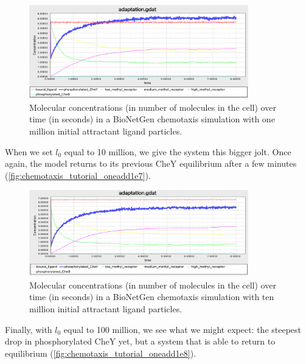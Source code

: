 \begin{figure}[h]
\centering
\mySfFamily
\includegraphics[width = 0.85\textwidth]{../images/chemotaxis_tutorial_oneadd1e6.png}
\caption{Molecular concentrations (in number of molecules in the cell) over time (in seconds) in a BioNetGen chemotaxis simulation with one million initial attractant ligand particles.}
\label{fig:chemotaxis_tutorial_oneadd16}
\end{figure}

When we set $l_0$ equal to 10 million, we give the system this bigger jolt. Once again, the model returns to its previous CheY equilibrium after a few minutes (\autoref{fig:chemotaxis_tutorial_oneadd1e7}).

\begin{figure}[h]
\centering
\mySfFamily
\includegraphics[width = 0.85\textwidth]{../images/chemotaxis_tutorial_oneadd1e7.png}
\caption{Molecular concentrations (in number of molecules in the cell) over time (in seconds) in a BioNetGen chemotaxis simulation with ten million initial attractant ligand particles.}
\label{fig:chemotaxis_tutorial_oneadd1e7}
\end{figure}

Finally, with $l_0$ equal to 100 million, we see what we might expect: the steepest drop in phosphorylated CheY yet, but a system that is able to return to equilibrium (\autoref{fig:chemotaxis_tutorial_oneadd1e8}).

